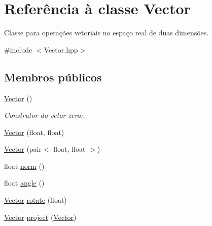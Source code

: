 \hypertarget{classVector}{}\section{Referência à classe Vector}
\label{classVector}


Classe para operações vetoriais no espaço real de duas dimensões.  




{\ttfamily \#include $<$Vector.\+hpp$>$}

\subsection*{Membros públicos}
\begin{DoxyCompactItemize}
\item 
\mbox{\label{classVector_a6f80c73b5f18dcf3f8e36065bdc8b9e5}} 
\mbox{\hyperlink{classVector_a6f80c73b5f18dcf3f8e36065bdc8b9e5}{Vector}} ()
\begin{DoxyCompactList}\small\item\em Construtor do vetor zero;. \end{DoxyCompactList}\item 
\mbox{\hyperlink{classVector_a1d3e69fe5741740aa40e7b5fd2cbf0e8}{Vector}} (float, float)
\item 
\mbox{\hyperlink{classVector_abdb4dca6245e33a8661d1ab02bb50016}{Vector}} (pair$<$ float, float $>$)
\item 
float \mbox{\hyperlink{classVector_a4d643a71ea7c87cb77ab7bdfb26b42ba}{norm}} ()
\item 
float \mbox{\hyperlink{classVector_ac83edd3ce21c2eea555a360f64cf0acc}{angle}} ()
\item 
\mbox{\hyperlink{classVector}{Vector}} \mbox{\hyperlink{classVector_ac2e3094ce0134c3509ce4ef7df78245a}{rotate}} (float)
\item 
\mbox{\hyperlink{classVector}{Vector}} \mbox{\hyperlink{classVector_a7f187d9dc1da47c2d3754e8260a4c0e7}{project}} (\mbox{\hyperlink{classVector}{Vector}})
\end{DoxyCompactItemize}

